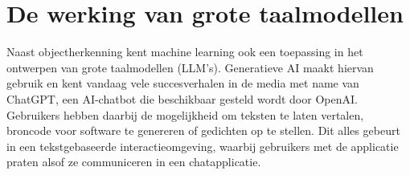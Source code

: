 \section{De werking van grote taalmodellen}
\label{sec:ls-artificiele-intelligentie}
Naast objectherkenning kent machine learning ook een toepassing in het ontwerpen van grote taalmodellen (LLM's).
Generatieve AI maakt hiervan gebruik en kent vandaag vele succesverhalen in de media met name van ChatGPT, een AI-chatbot die beschikbaar gesteld wordt door OpenAI\@.
Gebruikers hebben daarbij de mogelijkheid om teksten te laten vertalen, broncode voor software te genereren of gedichten op te stellen.
Dit alles gebeurt in een tekstgebaseerde interactieomgeving, waarbij gebruikers met de applicatie praten alsof ze communiceren in een chatapplicatie.
